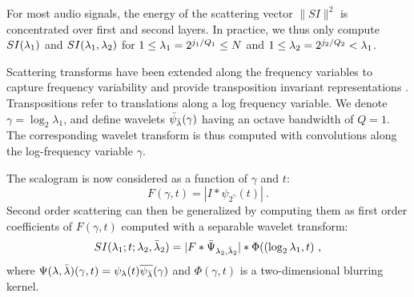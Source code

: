 For most audio signals, the energy of the scattering
vector $\|S I\|^2$ is concentrated over first and second layers. 
In practice, we thus only compute $S I({\lambda}_1)$ and
$S I({\lambda}_1,{\lambda}_2)$ for $1 \leq {\lambda}_1 = 2^{j_1/Q_1} \leq N$
and $1 \leq {\lambda}_2 = 2^{j_2/Q_2} < {\lambda}_1$. 

Scattering transforms have been extended along the frequency
variables to capture frequency variability and provide transposition
invariant representations \cite{deepscatt}. 
Transpositions refer to translations
along a log frequency variable. 
We denote $\gamma = \log_2 \lambda_1$, and
define 
wavelets $\bar \psi_{\bar {{\lambda}}} (\gamma)$ having an octave bandwidth of $Q = 1$.
The corresponding wavelet transform is thus computed with convolutions
along the log-frequency variable $\gamma$.

The scalogram is now considered as a function of $\gamma$ and $t$: 
\[
F (\gamma, t) = |I \ast \psi_{2^{\gamma}} (t)|~.
\]
Second order scattering can then be generalized 
by computing them as first
order coefficients of $F (\gamma,t )$ computed
with a separable wavelet transform: %
\[
S I ({\lambda}_1; t;  {\lambda}_2, \bar {{\lambda}}_2) = 
 |F \ast \bar \Psi_{{\lambda}_2, \bar {{\lambda}}_2} | \ast \Phi( (\log_2 {\lambda}_1, t)~,
\]
where $\Psi({\lambda}, \bar {{\lambda}})(\gamma, t) = \psi_{{\lambda}}(t) \overline{\psi_{\bar {{\lambda}}}}(\gamma)$ and
$\Phi(\gamma, t)$ is a two-dimensional blurring kernel.


%
%
%
%
%
%

